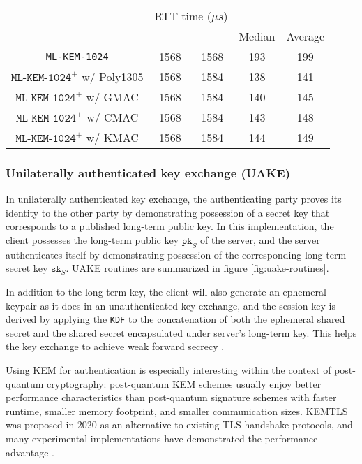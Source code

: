 \documentclass[journal=tches,submission]{iacrtrans}
\newcommand{\pk}{\texttt{pk}}
\newcommand{\sk}{\texttt{sk}}
\newcommand{\us}{\mu s}
\begin{document}
\begin{table}[H]
\begin{tabular}{|c|c|c|c|c|}
        & \multicolumn{2}{|c|}{RTT time ($\us$)} \\
        \cline{4-5}
        & & & Median & Average \\
        \hline
        \texttt{ML-KEM-1024} & 1568 & 1568 & 193 & 199 \\
        \hline
        $\texttt{ML-KEM-1024}^+$ w/ Poly1305 & 1568 & 1584 & 138 & 141 \\
        \hline
        $\texttt{ML-KEM-1024}^+$ w/ GMAC & 1568 & 1584 & 140 & 145 \\
        \hline
        $\texttt{ML-KEM-1024}^+$ w/ CMAC & 1568 & 1584 & 143 & 148 \\
        \hline
        $\texttt{ML-KEM-1024}^+$ w/ KMAC & 1568 & 1584 & 144 & 149 \\
        \hline
    \end{tabular}
\end{table}

\subsubsection{Unilaterally authenticated key exchange (UAKE)}\label{sec:uakex}
In unilaterally authenticated key exchange, the authenticating party proves its identity to the other party by demonstrating possession of a secret key that corresponds to a published long-term public key. In this implementation, the client possesses the long-term public key $\pk_S$ of the server, and the server authenticates itself by demonstrating possession of the corresponding long-term secret key $\sk_S$. UAKE routines are summarized in figure \ref{fig:uake-routines}.

In addition to the long-term key, the client will also generate an ephemeral keypair as it does in an unauthenticated key exchange, and the session key is derived by applying the \texttt{KDF} to the concatenation of both the ephemeral shared secret and the shared secret encapsulated under server's long-term key. This helps the key exchange to achieve weak forward secrecy \cite{DBLP:conf/eurocrypt/CanettiK01}.

Using KEM for authentication is especially interesting within the context of post-quantum cryptography: post-quantum KEM schemes usually enjoy better performance characteristics than post-quantum signature schemes with faster runtime, smaller memory footprint, and smaller communication sizes. KEMTLS was proposed in 2020 as an alternative to existing TLS handshake protocols, and many experimental implementations have demonstrated the performance advantage \cite{DBLP:conf/ccs/SchwabeSW20}.
\end{document}
